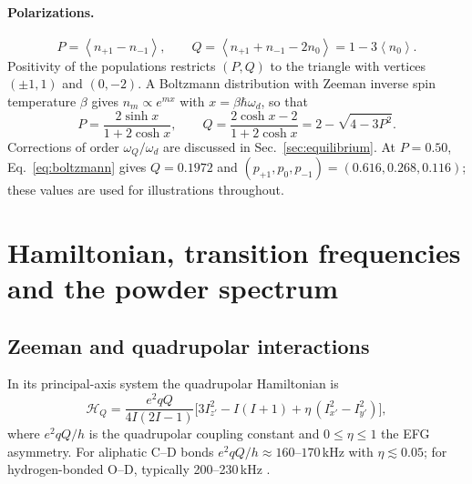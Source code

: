 \documentclass[11pt]{article}
\newcommand{\avg}[1]{\left\langle #1\right\rangle}
\begin{document}
\paragraph{Polarizations.}
\begin{equation}
P = \avg{n_{+1}-n_{-1}}, \qquad Q=\avg{n_{+1}+n_{-1}-2n_0}=1-3\avg{n_0}.
\label{eq:PQ}
\end{equation}
Positivity of the populations restricts $(P,Q)$ to the triangle with vertices $(\pm1,1)$ and
$(0,-2)$. A Boltzmann distribution with Zeeman inverse spin temperature $\beta$ gives
$n_m\propto e^{m x}$ with $x=\beta\hbar\omega_d$, so that
\begin{equation}
P=\frac{2\sinh x}{1+2\cosh x},\qquad Q=\frac{2\cosh x-2}{1+2\cosh x}=2-\sqrt{4-3P^2}.
\label{eq:boltzmann}
\end{equation}
Corrections of order $\omega_Q/\omega_d$ are discussed in Sec.~\ref{sec:equilibrium}. At
$P=0.50$, Eq.~\eqref{eq:boltzmann} gives $Q=0.1972$ and
$(p_{+1},p_0,p_{-1})=(0.616,0.268,0.116)$; these values are used for illustrations
throughout.

\section{Hamiltonian, transition frequencies and the powder spectrum}
\label{sec:hamiltonian}

\subsection{Zeeman and quadrupolar interactions}
In its principal-axis system the quadrupolar Hamiltonian is
\cite{CohenReif1957,Abragam1961,Wasylishen2012}
\begin{equation}
\mathcal H_Q=\frac{e^2qQ}{4I(2I-1)}\Big[3I_{z'}^2-I(I+1)+\eta\,(I_{x'}^2-I_{y'}^2)\Big],
\end{equation}
where $e^2qQ/h$ is the quadrupolar coupling constant and $0\le\eta\le1$ the EFG asymmetry.
For aliphatic C--D bonds $e^2qQ/h\approx 160$--$170$\,kHz with $\eta\lesssim0.05$; for
hydrogen-bonded O--D, typically 200--230\,kHz \cite{Wasylishen2012}.
\end{document}
